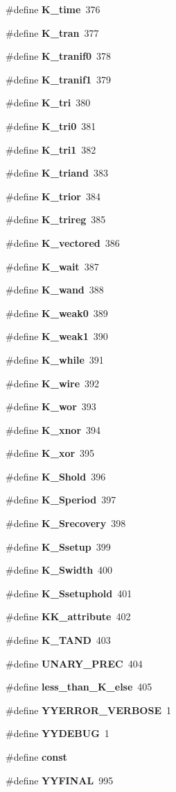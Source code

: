 \begin{CompactItemize}
\#define {\bf K\_\-time}\ 376
\item 
\#define {\bf K\_\-tran}\ 377
\item 
\#define {\bf K\_\-tranif0}\ 378
\item 
\#define {\bf K\_\-tranif1}\ 379
\item 
\#define {\bf K\_\-tri}\ 380
\item 
\#define {\bf K\_\-tri0}\ 381
\item 
\#define {\bf K\_\-tri1}\ 382
\item 
\#define {\bf K\_\-triand}\ 383
\item 
\#define {\bf K\_\-trior}\ 384
\item 
\#define {\bf K\_\-trireg}\ 385
\item 
\#define {\bf K\_\-vectored}\ 386
\item 
\#define {\bf K\_\-wait}\ 387
\item 
\#define {\bf K\_\-wand}\ 388
\item 
\#define {\bf K\_\-weak0}\ 389
\item 
\#define {\bf K\_\-weak1}\ 390
\item 
\#define {\bf K\_\-while}\ 391
\item 
\#define {\bf K\_\-wire}\ 392
\item 
\#define {\bf K\_\-wor}\ 393
\item 
\#define {\bf K\_\-xnor}\ 394
\item 
\#define {\bf K\_\-xor}\ 395
\item 
\#define {\bf K\_\-Shold}\ 396
\item 
\#define {\bf K\_\-Speriod}\ 397
\item 
\#define {\bf K\_\-Srecovery}\ 398
\item 
\#define {\bf K\_\-Ssetup}\ 399
\item 
\#define {\bf K\_\-Swidth}\ 400
\item 
\#define {\bf K\_\-Ssetuphold}\ 401
\item 
\#define {\bf KK\_\-attribute}\ 402
\item 
\#define {\bf K\_\-TAND}\ 403
\item 
\#define {\bf UNARY\_\-PREC}\ 404
\item 
\#define {\bf less\_\-than\_\-K\_\-else}\ 405
\item 
\#define {\bf YYERROR\_\-VERBOSE}\ 1
\item 
\#define {\bf YYDEBUG}\ 1
\item 
\#define {\bf const}
\item 
\#define {\bf YYFINAL}\ 995

\end{CompactItemize}
